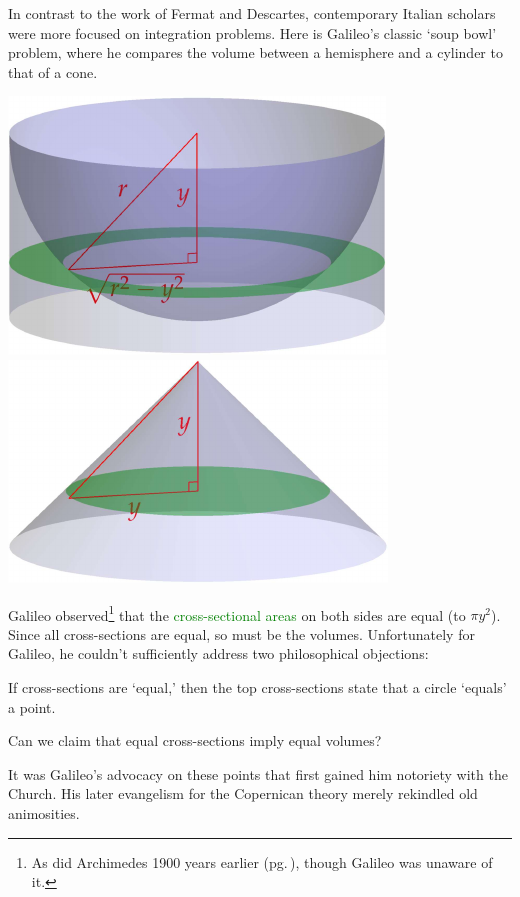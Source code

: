 
In contrast to the work of Fermat and Descartes, contemporary Italian scholars were more focused on integration problems. Here is Galileo's classic `soup bowl' problem, where he compares the volume between a hemisphere and a cylinder to that of a cone.
\begin{center}
\includegraphics{analytic-soupbowl}\qquad\qquad
\includegraphics{analytic-soupbowl2}
\end{center}

Galileo observed\footnote{As did Archimedes 1900 years earlier (pg.\,\pageref{pg:archmethod}), though Galileo was unaware of it.} that the \textcolor{Green}{cross-sectional areas} on both sides are equal (to $\pi y^2$). Since all cross-sections are equal, so must be the volumes. Unfortunately for Galileo, he couldn't sufficiently address two philosophical objections:
\begin{description}\itemsep0pt
  \item[\normalfont\emph{The zero-measure problem}] If cross-sections are `equal,' then the top cross-sections state that a circle `equals' a point.
  \item[\normalfont\emph{Infinitesimals sum to the whole?}] Can we claim that equal cross-sections imply equal volumes?
\end{description}
It was Galileo's advocacy on these points that first gained him notoriety with the Church. His later evangelism for the Copernican theory merely rekindled old animosities.

